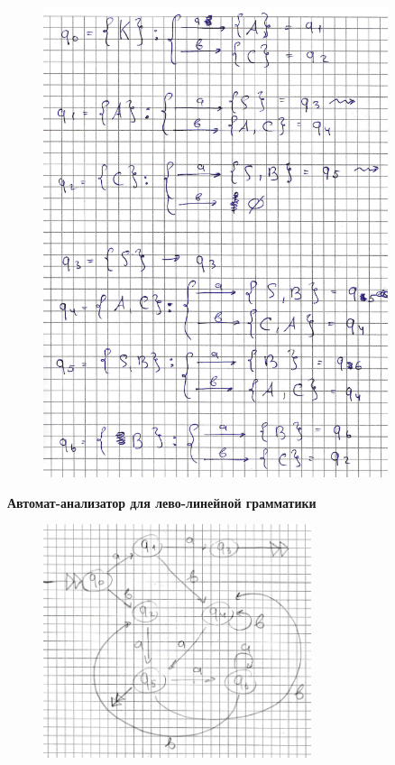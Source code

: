 \documentclass[a4paper, 14pt]{extarticle}
\begin{document}
\begin{figure}[h]
  \centering
  \includegraphics[width=0.9\textwidth,height=0.9\textheight,keepaspectratio]{four}
\end{figure}

\newpage

\begin{center}
  \normalsize
  \bfseries
  Автомат-анализатор для лево-линейной грамматики
\end{center}

\begin{figure}[h]
  \centering
  \includegraphics[width=0.7\textwidth,height=0.7\textheight,keepaspectratio]{five}
\end{figure}
\end{document}
